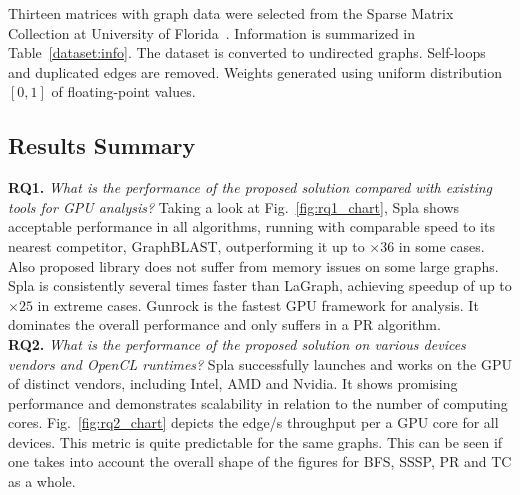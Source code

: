 Thirteen matrices with graph data were selected from the Sparse Matrix Collection at University of Florida~\cite{dataset:10.1145/2049662.2049663}. 
Information is summarized in Table~\ref{dataset:info}. 
The dataset is converted to undirected graphs. 
Self-loops and duplicated edges are removed. 
Weights generated using uniform distribution $[0, 1]$ of floating-point values.

\subsection{Results Summary}

\textbf{RQ1.} \textit{What is the performance of the proposed solution compared with existing tools for GPU analysis?} Taking a look at Fig.~\ref{fig:rq1_chart}, Spla shows acceptable performance in all algorithms, running with comparable speed to its nearest competitor, GraphBLAST, outperforming it up to $\times36$ in some cases. Also proposed library does not suffer from memory issues on some large graphs. Spla is consistently several times faster than LaGraph, achieving speedup of up to $\times25$ in extreme cases. Gunrock is the fastest GPU framework for analysis. It dominates the overall performance and only suffers in a PR algorithm.\\

\textbf{RQ2.} \textit{What is the performance of the proposed solution on various devices vendors and OpenCL runtimes?} Spla successfully launches and works on the GPU of distinct vendors, including Intel, AMD and Nvidia. It shows promising performance and demonstrates scalability in relation to the number of computing cores. Fig.~\ref{fig:rq2_chart} depicts the edge/s throughput per a GPU core for all devices. This metric is quite predictable for the same graphs. This can be seen if one takes into account the overall shape of the figures for BFS, SSSP, PR and TC as a whole.